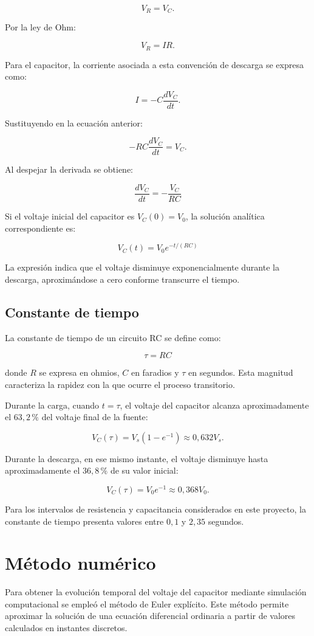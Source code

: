 \documentclass[11pt,a4paper]{article}
\begin{document}
\[
V_R=V_C.
\]

Por la ley de Ohm:

\[
V_R=IR.
\]

Para el capacitor, la corriente asociada a esta convención de
descarga se expresa como:

\[
I=-C\frac{dV_C}{dt}.
\]

Sustituyendo en la ecuación anterior:

\[
-RC\frac{dV_C}{dt}=V_C.
\]

Al despejar la derivada se obtiene:

\[
\boxed{
\frac{dV_C}{dt}=-\frac{V_C}{RC}
}
\]

Si el voltaje inicial del capacitor es $V_C(0)=V_0$, la solución
analítica correspondiente es:

\[
\boxed{
V_C(t)=V_0e^{-t/(RC)}
}
\]

La expresión indica que el voltaje disminuye exponencialmente
durante la descarga, aproximándose a cero conforme transcurre
el tiempo.

\subsection{Constante de tiempo}

La constante de tiempo de un circuito RC se define como:

\[
\boxed{\tau=RC}
\]

donde $R$ se expresa en ohmios, $C$ en faradios y $\tau$ en
segundos. Esta magnitud caracteriza la rapidez con la que ocurre
el proceso transitorio.

Durante la carga, cuando $t=\tau$, el voltaje del capacitor
alcanza aproximadamente el $63,2\,\%$ del voltaje final de la
fuente:

\[
V_C(\tau)=V_s(1-e^{-1})\approx0,632V_s.
\]

Durante la descarga, en ese mismo instante, el voltaje disminuye
hasta aproximadamente el $36,8\,\%$ de su valor inicial:

\[
V_C(\tau)=V_0e^{-1}\approx0,368V_0.
\]

Para los intervalos de resistencia y capacitancia considerados
en este proyecto, la constante de tiempo presenta valores entre
$0,1$ y $2,35$ segundos.

\section{Método numérico}

Para obtener la evolución temporal del voltaje del capacitor
mediante simulación computacional se empleó el método de Euler
explícito. Este método permite aproximar la solución de una
ecuación diferencial ordinaria a partir de valores calculados
en instantes discretos.
\end{document}
